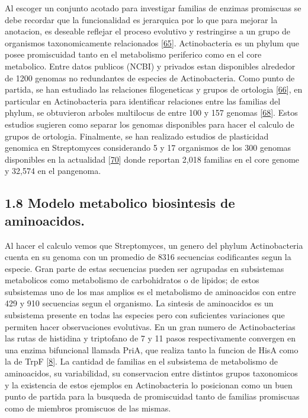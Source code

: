 \documentclass[12pt,twoside]{reedthesis}
\begin{document}
  Al escoger un conjunto acotado para investigar familias de enzimas
  promiscuas se debe recordar que la funcionalidad es jerarquica por lo
  que para mejorar la anotacion, es deseable reflejar el proceso evolutivo
  y restringirse a un grupo de organismos taxonomicamente relacionados
  {[}\protect\hyperlink{ref-cruz-moralesux5fphylogenomicux5f2016}{65}{]}.
  Actinobacteria es un phylum que posee promiscuidad tanto en el
  metabolismo periferico como en el core metabolico. Entre datos publicos
  (NCBI) y privados estan disponibles alrededor de 1200 genomas no
  redundantes de especies de Actinobacteria. Como punto de partida, se han
  estudiado las relaciones filogeneticas y grupos de ortologia
  {[}\protect\hyperlink{ref-liux5forthomclux5f2003}{66}{]}, en particular
  en Actinobacteria para identificar relaciones entre las familias del
  phylum, se obtuvieron arboles multilocus de entre 100 y 157 genomas
  {[}\protect\hyperlink{ref-gaoux5fphylogeneticux5f2012}{68}{]}. Estos
  estudios sugieren como separar los genomas disponibles para hacer el
  calculo de grupos de ortologia. Finalmente, se han realizado estudios de
  plasticidad genomica en Streptomyces considerando 5 y 17 organismos de
  los 300 genomas disponibles en la actualidad
  {[}\protect\hyperlink{ref-zhouux5fgenomeux5f2012}{70}{]} donde reportan
  2,018 familias en el core genome y 32,574 en el pangenoma.
  
  \subsection{1.8 Modelo metabolico biosintesis de
  aminoacidos.}\label{modelo-metabolico-biosintesis-de-aminoacidos.}
  
  Al hacer el calculo vemos que Streptomyces, un genero del phylum
  Actinobacteria cuenta en su genoma con un promedio de 8316 secuencias
  codificantes segun la especie. Gran parte de estas secuencias pueden ser
  agrupadas en subsistemas metabolicos como metabolismo de carbohidratos o
  de lipidos; de estos subsistemas uno de los mas amplios es el
  metabolismo de aminoacidos con entre 429 y 910 secuencias segun el
  organismo. La sintesis de aminoacidos es un subsistema presente en todas
  las especies pero con suficientes variaciones que permiten hacer
  observaciones evolutivas. En un gran numero de Actinobacterias las rutas
  de histidina y triptofano de 7 y 11 pasos respectivamente convergen en
  una enzima bifuncional llamada PriA, que realiza tanto la funcion de
  HisA como la de TrpF
  {[}\protect\hyperlink{ref-baronagomezux5foccurrenceux5f2003}{8}{]}. La
  cantidad de familias en el subsistema de metabolismo de aminoacidos, su
  variabilidad, su conservacion entre distintos grupos taxonomicos y la
  existencia de estos ejemplos en Actinobacteria lo posicionan como un
  buen punto de partida para la busqueda de promiscuidad tanto de familias
  promiscuas como de miembros promiscuos de las mismas.
  
\end{document}
